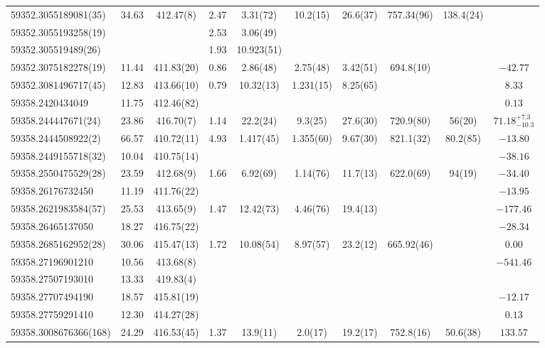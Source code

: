 \documentclass[preprint2, trackchanges]{aastex631}
\begin{document}
{{\begin{longtable}{lccccccccc}
\hline
59352.3055189081(35) & 34.63 & 412.47(8) & 2.47 & 3.31(72) & 10.2(15)  & 26.6(37) & 757.34(96) & 138.4(24) &  \\
59352.3055193258(19)   &  & & 2.53 & 3.06(49) &  &   &  &  &  \\
59352.305519489(26)   &  & & 1.93 & 10.923(51) &  &    &  &  &  \\
\hline
59352.3075182278(19) & 11.44 & 411.83(20) & 0.86 & 2.86(48) & 2.75(48)  & 3.42(51) & 694.8(10) &  & $-42.77$ \\
\hline
59352.3081496717(45) & 12.83 & 413.66(10) & 0.79 & 10.32(13) & 1.231(15)  & 8.25(65) &  &  & $8.33$ \\
\hline
59358.2420434049 & 11.75 & 412.46(82) &  &  &  &   &  &  & $0.13$ \\
\hline
59358.244447671(24) & 23.86 & 416.70(7) & 1.14 & 22.2(24) & 9.3(25)  & 27.6(30) & 720.9(80) & 56(20) & $71.18^{+7.3}_{-10.3}$ \\
\hline
59358.2444508922(2) & 66.57 & 410.72(11) & 4.93 & 1.417(45) & 1.355(60)  & 9.67(30) & 821.1(32) & 80.2(85) & $-13.80$ \\
\hline
59358.2449155718(32) & 10.04 & 410.75(14) &  &  &   &  &  &  & $-38.16$ \\
\hline
59358.2550475529(28) & 23.59 & 412.68(9) & 1.66 & 6.92(69) & 1.14(76)  & 11.7(13) & 622.0(69) & 94(19) & $-34.40$ \\
\hline
59358.26176732450 & 11.19 & 411.76(22) &  &  &   &  &  &  & $-13.95$ \\
\hline
59358.2621983584(57) & 25.53 & 413.65(9) & 1.47 & 12.42(73) & 4.46(76)  & 19.4(13) &  &  & $-177.46$ \\
\hline
59358.26465137050 & 18.27 & 416.75(22) &  &  &   &  &  &  & $-28.34$ \\
\hline
59358.2685162952(28) & 30.06 & 415.47(13) & 1.72 & 10.08(54) & 8.97(57)  & 23.2(12) & 665.92(46) &  & $0.00$ \\
\hline
59358.27196901210 & 10.56 & 413.68(8) &  &  &   &  &  &  & $-541.46$ \\
\hline
59358.27507193010 & 13.33 & 419.83(4) &  &  &  &  &  &  &  \\
\hline
59358.27707494190 & 18.57 & 415.81(19) &  &  &   &  &  &  & $-12.17$ \\
\hline
59358.27759291410 & 12.30 & 414.27(28) &  &  &  &   &  &  & $0.13$ \\
\hline
59358.3008676366(168) & 24.29 & 416.53(45) & 1.37 & 13.9(11) & 2.0(17)  & 19.2(17) & 752.8(16) & 50.6(38) & $133.57$ \\

\end{longtable}}}
\end{document}
